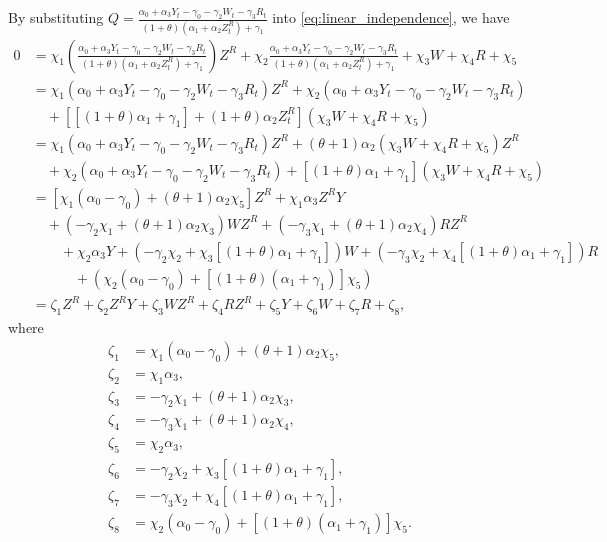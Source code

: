 \documentclass[11pt, a4paper]{article}
\begin{document}
By substituting $Q =  \frac{\alpha_0 + \alpha_3 Y_t - \gamma_0 - \gamma_2 W_{t} - \gamma_3 R_{t}}{(1 + \theta) (\alpha_1 + \alpha_2 Z^{R}_{t}) + \gamma_1} $ into \eqref{eq:linear_independence}, we have
\begin{align*}
    0 &= \chi_1 \left( \frac{\alpha_0 + \alpha_3 Y_t - \gamma_0 - \gamma_2 W_{t} - \gamma_3 R_{t}}{(1 + \theta) (\alpha_1 + \alpha_2 Z^{R}_{t}) + \gamma_1}  \right) Z^R + \chi_2  \frac{\alpha_0 + \alpha_3 Y_t - \gamma_0 - \gamma_2 W_{t} - \gamma_3 R_{t}}{(1 + \theta) (\alpha_1 + \alpha_2 Z^{R}_{t}) + \gamma_1} + \chi_3 W + \chi_4 R + \chi_5\\
    &= \chi_1 (\alpha_0 + \alpha_3 Y_t - \gamma_0 - \gamma_2 W_{t} - \gamma_3 R_{t}) Z^R + \chi_2 (\alpha_0 + \alpha_3 Y_t - \gamma_0 - \gamma_2 W_{t} - \gamma_3 R_{t})\\
    & \quad + [[(1 + \theta) \alpha_1 +\gamma_1] + (1 + \theta) \alpha_2 Z^{R}_{t}] (\chi_3 W + \chi_4 R + \chi_5)\\
    & = \chi_1 (\alpha_0 + \alpha_3 Y_t - \gamma_0 - \gamma_2 W_{t} - \gamma_3 R_{t}) Z^R  + (\theta + 1)\alpha_2 (\chi_3 W + \chi_4 R + \chi_5) Z^R\\
    & \quad + \chi_2(\alpha_0 + \alpha_3 Y_t - \gamma_0 - \gamma_2 W_{t} - \gamma_3 R_{t}) + [(1 + \theta) \alpha_1 +\gamma_1] (\chi_3 W + \chi_4 R + \chi_5)\\
    &= [\chi_1 (\alpha_0 -\gamma_0) + (\theta + 1)\alpha_2 \chi_5] Z^R + \chi_1 \alpha_3 Z^R Y\\
    &\quad + (-\gamma_2 \chi_1 + (\theta + 1)\alpha_2\chi_3) WZ^R +  (-\gamma_3 \chi_1 + (\theta + 1)\alpha_2\chi_4)  RZ^R\\
    &\quad\quad + \chi_2 \alpha_3Y + (-\gamma_2 \chi_2 + \chi_3 [(1 + \theta) \alpha_1 +\gamma_1]) W + (-\gamma_3 \chi_2 + \chi_4 [(1 + \theta) \alpha_1 +\gamma_1] ) R \\
    &\quad\quad \quad + (\chi_2 (\alpha_0 - \gamma_0) + [(1 + \theta) (\alpha_1 +\gamma_1)]\chi_5)\\
     & = \zeta_1 Z^R + \zeta_2 Z^RY + \zeta_3 WZ^R + \zeta_4 RZ^R + \zeta_5 Y + \zeta_6 W + \zeta_7 R + \zeta_8, 
\end{align*}
where 
\begin{align*}
    \zeta_1 &= \chi_1 (\alpha_0 - \gamma_0) + (\theta +1 )\alpha_2 \chi_5,\\
    \zeta_2 &= \chi_1\alpha_3,\\
    \zeta_3 &= -\gamma_2 \chi_1 + (\theta + 1)\alpha_2\chi_3,\\
    \zeta_4 &= -\gamma_3 \chi_1 + (\theta + 1)\alpha_2\chi_4,\\
    \zeta_5 &= \chi_2 \alpha_3,\\
    \zeta_6 &= -\gamma_2 \chi_2 + \chi_3 [(1 + \theta) \alpha_1 +\gamma_1],\\
    \zeta_7 &= -\gamma_3 \chi_2 + \chi_4 [(1 + \theta) \alpha_1 +\gamma_1],\\
    \zeta_8 &= \chi_2 (\alpha_0 - \gamma_0) + [(1 + \theta) (\alpha_1 +\gamma_1)]\chi_5.
\end{align*}
\end{document}

